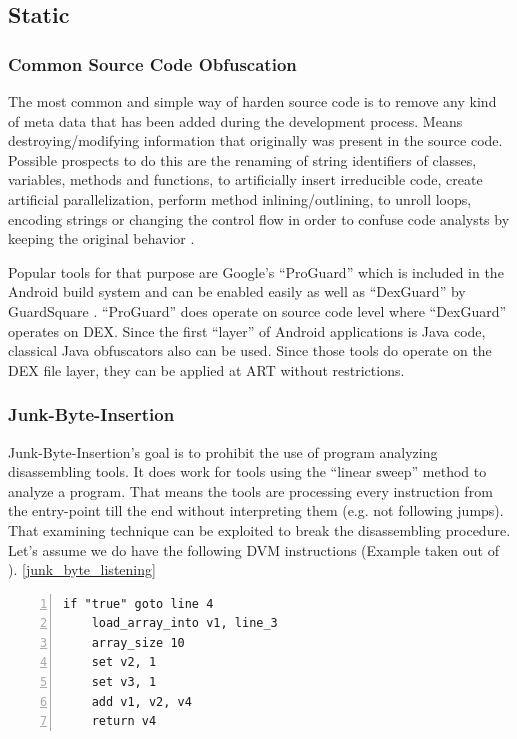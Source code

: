 \subsection{Static}
\subsubsection{Common Source Code Obfuscation}
The most common and simple way of harden source code is to remove any kind of meta data
that has been added during the development process. Means destroying/modifying
information that originally was present in the source code.
Possible prospects to do this are the renaming of string identifiers of
classes, variables, methods and functions, to artificially insert
irreducible code, create artificial parallelization, perform method inlining/outlining, to unroll loops, encoding strings or changing the control flow in
order to confuse code analysts by keeping the original behavior
\parencite[p.87]{lvl_imp}.

Popular tools for that purpose are Google's ``ProGuard''
\parencite{proguardtool} which is included in the Android build system and
can be enabled easily as well as ``DexGuard'' by GuardSquare
\parencite{dexguardtool}. ``ProGuard'' does
operate on source code level where ``DexGuard'' operates on DEX.
Since the first ``layer'' of Android applications is Java code, classical Java
obfuscators also can be used.
Since those tools do operate on the DEX file layer, they can be applied at ART without restrictions.

\subsubsection{Junk-Byte-Insertion}
Junk-Byte-Insertion's goal is to prohibit the use of program analyzing
disassembling tools. It does work for tools using the
``linear sweep'' method to analyze a program. That means
the tools are processing every instruction from the entry-point
till the end without interpreting them (e.g. not following jumps).
That examining technique can be exploited to break the disassembling
procedure. Let's assume we do have the following DVM instructions (Example taken out of \parencite[p.67]{lvl_imp}).
\autoref{junk_byte_listening}
  \begin{lstlisting}[language={[x64]Assembler}, caption=Junk-Byte-Insertion, label=junk_byte_listening, numbers=left]
    if "true" goto line 4
    load_array_into v1, line_3
    array_size 10
    set v2, 1
    set v3, 1
    add v1, v2, v4
    return v4
  \end{lstlisting}

